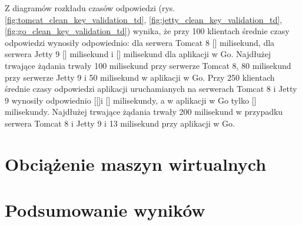 Z diagramów rozkładu czasów odpowiedzi (rys. \ref{fig:tomcat_clean_key_validation_td}, \ref{fig:jetty_clean_key_validation_td}, \ref{fig:go_clean_key_validation_td}) wynika, że przy 100 klientach średnie czasy odpowiedzi wynosiły odpowiednio: dla serwera Tomcat 8 [] milisekund, dla serwera Jetty 9 [] milisekund i [] milisekund dla aplikacji w Go. Najdłużej trwające żądania trwały 100 milisekund przy serwerze Tomcat 8, 80 milisekund przy serwerze  Jetty 9 i 50 milisekund  w aplikacji w Go. Przy 250 klientach średnie czasy odpowiedzi aplikacji uruchamianych na serwerach Tomcat 8 i Jetty 9  wynosiły odpowiednio [[]i [] milisekundy, a w aplikacji w Go tylko [] milisekundy. Najdłużej trwające żądania trwały 200 milisekund w przypadku serwera Tomcat 8 i Jetty 9 i 13 milisekund przy aplikacji w Go. 

% 
\clearpage

\section{Obciążenie maszyn wirtualnych}

\newpage
\section{Podsumowanie wyników}
